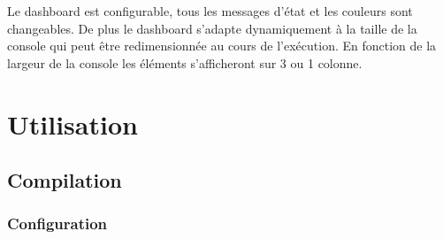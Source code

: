 \documentclass[article, backcover, french, nodocumentinfo]{upmethodology-document}
\begin{document}
					Le dashboard est configurable, tous les messages d'état et les couleurs sont changeables. De plus le dashboard s'adapte dynamiquement à la taille de la console qui peut être redimensionnée au cours de l’exécution. En fonction de la largeur de la console les éléments s’afficheront sur 3 ou 1 colonne.
	\section{Utilisation}
		\subsection{Compilation}
			\subsubsection{Configuration}
\end{document}
